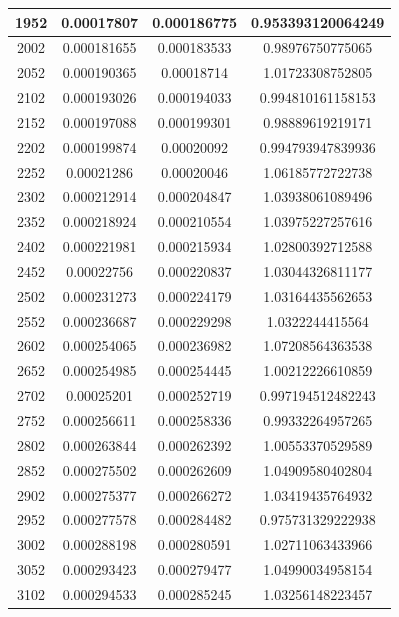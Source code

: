 \documentclass{article}
\begin{document}
\begin{longtable}{|c|c|c|c|}
		1952	&   0.00017807	  & 0.000186775	 &  0.953393120064249   \\ \hline
		2002	&   0.000181655	  & 0.000183533	 &  0.98976750775065   \\ \hline
		2052	&   0.000190365	  & 0.00018714	 &  1.01723308752805   \\ \hline
		2102	&   0.000193026	  & 0.000194033	 &  0.994810161158153   \\ \hline
		2152	&   0.000197088	  & 0.000199301	 &  0.98889619219171   \\ \hline
		2202	&   0.000199874	  & 0.00020092	 &  0.994793947839936   \\ \hline
		2252	&   0.00021286	  & 0.00020046	 &  1.06185772722738   \\ \hline
		2302	&   0.000212914	  & 0.000204847	 &  1.03938061089496   \\ \hline
		2352	&   0.000218924	  & 0.000210554	 &  1.03975227257616   \\ \hline
		2402	&   0.000221981	  & 0.000215934	 &  1.02800392712588   \\ \hline
		2452	&   0.00022756	  & 0.000220837	 &  1.03044326811177   \\ \hline
		2502	&   0.000231273	  & 0.000224179	 &  1.03164435562653   \\ \hline
		2552	&   0.000236687	  & 0.000229298	 &  1.0322244415564   \\ \hline
		2602	&   0.000254065	  & 0.000236982	 &  1.07208564363538   \\ \hline
		2652	&   0.000254985	  & 0.000254445	 &  1.00212226610859   \\ \hline
		2702	&   0.00025201	  & 0.000252719	 &  0.997194512482243   \\ \hline
		2752	&   0.000256611	  & 0.000258336	 &  0.99332264957265   \\ \hline
		2802	&   0.000263844	  & 0.000262392	 &  1.00553370529589   \\ \hline
		2852	&   0.000275502	  & 0.000262609	 &  1.04909580402804   \\ \hline
		2902	&   0.000275377	  & 0.000266272	 &  1.03419435764932   \\ \hline
		2952	&   0.000277578	  & 0.000284482	 &  0.975731329222938   \\ \hline
		3002	&   0.000288198	  & 0.000280591	 &  1.02711063433966   \\ \hline
		3052	&   0.000293423	  & 0.000279477	 &  1.04990034958154   \\ \hline
		3102	&   0.000294533	  & 0.000285245	 &  1.03256148223457   \\ \hline

\end{longtable}
\end{document}
